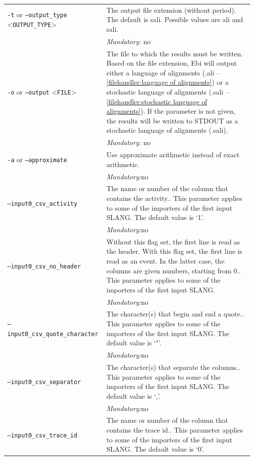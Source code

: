 {\begin{tabularx}{\linewidth}{lX}
\texttt{-t} or \texttt{--output\_type} <\texttt{OUTPUT\_TYPE}> &
The output file extension (without period). The default is sali. Possible values are ali and sali.\\
&\textit{Mandatory:} \quad no\\
\texttt{-o} or \texttt{--output} <\texttt{FILE}> &
The file to which the results must be written. Based on the file extension, Ebi will output either a language of alignments (.ali -- \cref{filehandler:language of alignments}) or a stochastic language of alignments (.sali -- \cref{filehandler:stochastic language of alignments}).
If the parameter is not given, the results will be written to STDOUT as a stochastic language of alignments (.sali).\\
&\textit{Mandatory:} \quad no\\
\texttt{-a} or \texttt{--approximate} & Use approximate arithmetic instead of exact arithmetic.\\
&\textit{Mandatory:}\quad no\\
\texttt{--input0\_csv\_activity} & The name or number of the column that contains the activity.. This parameter applies to some of the importers of the first input SLANG. The default value is `1'.\\
&\textit{Mandatory:}\quad no\\
\texttt{--input0\_csv\_no\_header} & Without this flag set, the first line is read as the header. 
    With this flag set, the first line is read as an event. In the latter case, the columns are given numbers, starting from 0.. This parameter applies to some of the importers of the first input SLANG. \\
&\textit{Mandatory:}\quad no\\
\texttt{--input0\_csv\_quote\_character} & The character(s) that begin and end a quote.. This parameter applies to some of the importers of the first input SLANG. The default value is `"'.\\
&\textit{Mandatory:}\quad no\\
\texttt{--input0\_csv\_separator} & The character(s) that separate the columns.. This parameter applies to some of the importers of the first input SLANG. The default value is `,'.\\
&\textit{Mandatory:}\quad no\\
\texttt{--input0\_csv\_trace\_id} & The name or number of the column that contains the trace id.. This parameter applies to some of the importers of the first input SLANG. The default value is `0'.\\

\end{tabularx}}
